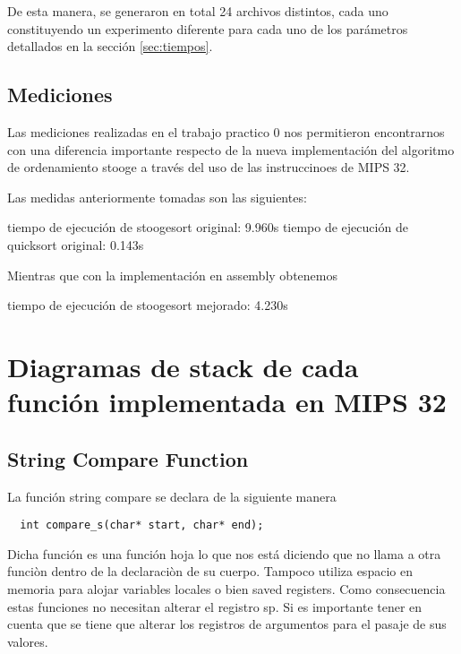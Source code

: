 \documentclass[a4paper,11pt]{article}
\begin{document}
De esta manera, se generaron en total 24 archivos distintos, cada uno
constituyendo un experimento diferente para cada uno de los parámetros
detallados en la sección \ref{sec:tiempos}.

\subsection{Mediciones}

Las mediciones realizadas en el trabajo practico 0 nos permitieron
encontrarnos con una diferencia importante respecto de la nueva 
implementación del algoritmo de ordenamiento stooge a través del uso
de las instruccinoes de MIPS 32.

Las medidas anteriormente tomadas son las siguientes:

\begin{enumerate}
  tiempo de ejecución de stoogesort original: 9.960s
  tiempo de ejecución de quicksort original: 0.143s
\end{enumerate}

Mientras que con la implementación en assembly obtenemos

\begin{enumerate}
  tiempo de ejecución de stoogesort mejorado: 4.230s
\end{enumerate}


\section{Diagramas de stack de cada función implementada en MIPS 32}

\subsection{String Compare Function}

La función string compare se declara de la siguiente manera

\begin{lstlisting}
  int compare_s(char* start, char* end);
\end{lstlisting}

Dicha función es una función hoja lo que nos está diciendo
que no llama a otra funciòn dentro de la declaraciòn de su cuerpo.
Tampoco utiliza espacio en memoria para alojar variables locales o bien
saved registers.
Como consecuencia estas funciones no necesitan alterar el registro sp.
Si es importante tener en cuenta que se tiene que alterar los registros
de argumentos para el pasaje de sus valores.
\end{document}
